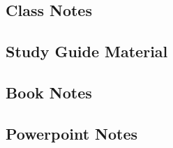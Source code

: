\documentclass{article}
\begin{document}
\section{}

\subsection{Class Notes}
\subsection{Study Guide Material}
\subsection{Book Notes}
\subsection{Powerpoint Notes}

\end{document}
